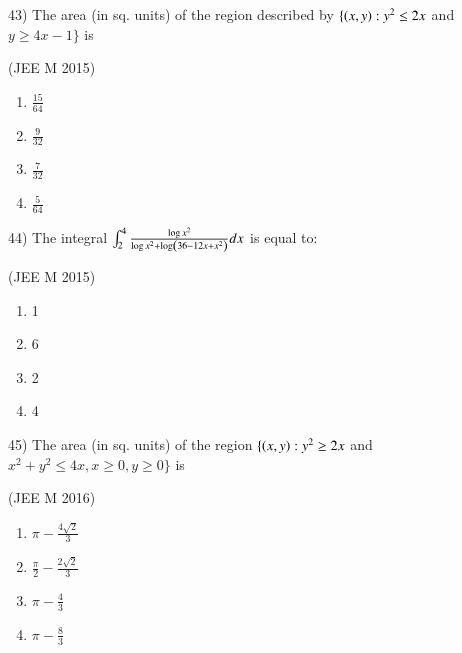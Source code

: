 \documentclass[journal,12pt,twocolumn]{IEEEtran}
\theoremstyle{remark}
\begin{document}
43)
	 The area (in sq. units) of the region described by $\{\left(x,y\right):y^2\leq2x$ and $y\geq4x-1\}$ is

		\hfill{(JEE M 2015)}

		\begin{multicols}{4}
			\begin{enumerate}[label=(\alph*)]
				\item $\frac{15}{64}$
				\item $\frac{9}{32}$
				\item $\frac{7}{32}$
				\item $\frac{5}{64}$
			\end{enumerate}
		\end{multicols}

44)
	The integral $\int_2^4\frac{\log x^2}{\log x^2 + \log\left(36-12x+x^2\right)}dx$ is equal to:

		\hfill{(JEE M 2015)}

		\begin{multicols}{4}
			\begin{enumerate}[label=(\alph*)]
				\item 1
				\item 6
				\item 2
				\item 4
			\end{enumerate}
		\end{multicols}

45)
	 The area (in sq. units) of the region $\{\left(x,y\right):y^2\geq2x$ and $x^2+y^2\leq4x, x\geq0, y\geq0\}$ is

		\hfill{(JEE M 2016)}

		\begin{multicols}{2}
			\begin{enumerate}[label=(\alph*)]
				\item $\pi-\frac{4\sqrt{2}}{3}$
				\item $\frac{\pi}{2}-\frac{2\sqrt{2}}{3}$
				\item $\pi-\frac{4}{3}$
				\item $\pi-\frac{8}{3}$ 
			\end{enumerate}
		\end{multicols} 
\end{document}
